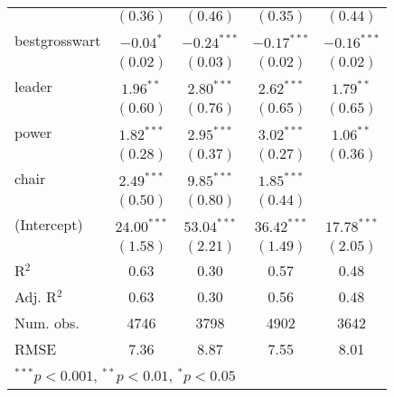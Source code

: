 \documentclass[12pt]{article}
\begin{document}
\begin{table}
\begin{center}
\begin{tabular}{l c c c c }
			& $(0.36)$      & $(0.46)$      & $(0.35)$      & $(0.44)$      \\
			bestgrosswart          & $-0.04^{*}$   & $-0.24^{***}$ & $-0.17^{***}$ & $-0.16^{***}$ \\
			& $(0.02)$      & $(0.03)$      & $(0.02)$      & $(0.02)$      \\
			leader                 & $1.96^{**}$   & $2.80^{***}$  & $2.62^{***}$  & $1.79^{**}$   \\
			& $(0.60)$      & $(0.76)$      & $(0.65)$      & $(0.65)$      \\
			power                  & $1.82^{***}$  & $2.95^{***}$  & $3.02^{***}$  & $1.06^{**}$   \\
			& $(0.28)$      & $(0.37)$      & $(0.27)$      & $(0.36)$      \\
			chair                  & $2.49^{***}$  & $9.85^{***}$  & $1.85^{***}$  &               \\
			& $(0.50)$      & $(0.80)$      & $(0.44)$      &               \\
			(Intercept)            & $24.00^{***}$ & $53.04^{***}$ & $36.42^{***}$ & $17.78^{***}$ \\
			& $(1.58)$      & $(2.21)$      & $(1.49)$      & $(2.05)$      \\
			\hline
			R$^2$                  & 0.63          & 0.30          & 0.57          & 0.48          \\
			Adj. R$^2$             & 0.63          & 0.30          & 0.56          & 0.48          \\
			Num. obs.              & 4746          & 3798          & 4902          & 3642          \\
			RMSE                   & 7.36          & 8.87          & 7.55          & 8.01          \\
			\hline
			\multicolumn{5}{l}{\scriptsize{$^{***}p<0.001$, $^{**}p<0.01$, $^*p<0.05$}}
		\end{tabular}
	\end{center}
\end{table}
\end{document}
